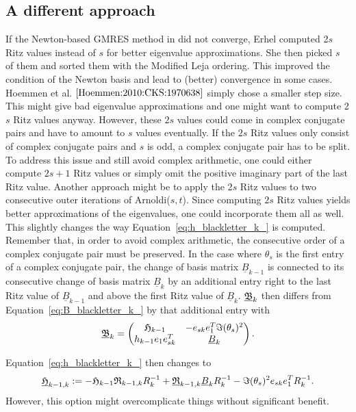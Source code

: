 \documentclass{scrartcl}
\numberwithin{equation}{section}
\begin{document}
\subsection{A different approach}
If the Newton-based GMRES method in \cite{Erhel95aparallel} did not converge, Erhel computed 2$s$ Ritz values instead of $s$ for better eigenvalue approximations. She then picked $s$ of them and sorted them with the Modified Leja ordering. This improved the condition of the Newton basis and lead to (better) convergence in some cases. Hoemmen et al. $\cite{Hoemmen:2010:CKS:1970638}$ simply chose a smaller step size. This might give bad eigenvalue approximations and one might want to compute 2$s$ Ritz values anyway. However, these $2s$ values could come in complex conjugate pairs and have to amount to $s$ values eventually. If the $2s$ Ritz values only consist of complex conjugate pairs and $s$ is odd, a complex conjugate pair has to be split. To address this issue and still avoid complex arithmetic, one could either compute $2s + 1$ Ritz values or simply omit the positive imaginary part of the last Ritz value. Another approach might be to apply the 2$s$ Ritz values to two consecutive outer iterations of Arnoldi($s,t$). Since computing $2s$ Ritz values yields better approximations of the eigenvalues, one could incorporate them all as well. This slightly changes the way Equation~\eqref{eq:h_blackletter_k_} is computed. Remember that, in order to avoid complex arithmetic, the consecutive order of a complex conjugate pair must be preserved. In the case where $\theta_s$ is the first entry of a complex conjugate pair, the change of basis matrix $\underline{B}_{k - 1 }$ is connected to its consecutive change of basis matrix $\underline{B}_{k}$ by an additional entry right to the last Ritz value of $\underline{B}_{k - 1}$ and above the first Ritz value of $\underline{B}_k$. $\underline{\frak{B}}_k$ then differs from Equation~\eqref{eq:B_blackletter_k_} by that additional entry with
\begin{equation}
\underline{\frak{B}}_{k} = 
\begin{pmatrix}
	\frak{H}_{k - 1} & -e_{sk} e^T_1 \Im (\theta_s)^2 \\
	h_{k - 1} e_1 e^T_{sk} & \underline{B}_k
\end{pmatrix}.
\end{equation}

Equation~\eqref{eq:h_blackletter_k_} then changes to
\begin{equation}
\underline{\frak{H}}_{k - 1, k} := -\frak{H}_{k - 1} \frak{R}_{k - 1, k} R^{-1}_k + \underline{\frak{R}}_{k - 1, k} \underline{B}_k R^{-1}_k - \Im (\theta_s)^2 e_{sk} e^T_1  R^{-1}_{k}.
\end{equation}
However, this option might overcomplicate things without significant benefit.
\end{document}
